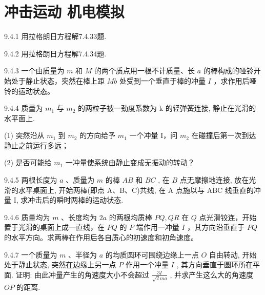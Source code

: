 \section{冲击运动 机电模拟}

\begin{problem}{9.4.1}
用拉格朗日方程解7.4.33题.
\end{problem}
\clearpage


\begin{problem}{9.4.2}
用拉格朗日方程解7.4.34题.
\end{problem}
\clearpage


\begin{problem}{9.4.3}
一个由质量为 $m$ 和 $M$ 的两个质点用一根不计质量、长 $a$ 的棒构成的哑铃开始处于静止状态，突然在棒上距 $Mb$ 处受到一个垂直于棒的冲量 $I$ ，求作用后哑铃的运动状态。
\end{problem}
\clearpage


\begin{problem}{9.4.4}
质量为 $m_{1}$ 与 $m_{2}$ 的两粒子被一劲度系数为 k 的轻弹簧连接, 静止在光滑的水平面上.

(1) 突然沿从 $m_{1}$ 到 $m_{2}$ 的方向给予 $m_{1}$ 一个冲量 I，问 $m_{2}$ 在碰撞后第一次到达静止之前运行多远；

(2) 是否可能给 $m_{1}$ 一冲量使系统由静止变成无振动的转动？
\end{problem}
\clearpage


\begin{problem}{9.4.5}
两根长度为 $a$ 、质量为 $m$ 的棒 $AB$ 和 $BC$ , 在 $B$ 点无摩擦地连接, 放在光滑的水平桌面上, 开始两棒(即点 A、B、C)共线, 在 A 点施以与 ABC 线垂直的冲量 I, 求冲击后的瞬时两棒的运动状态.
\end{problem}
\clearpage


\begin{problem}{9.4.6}
质量均为 $m$ 、长度均为 $2a$ 的两根均质棒 $PQ, QR$ 在 $Q$ 点光滑铰连，开始置于光滑的桌面上成一直线，在 $PQ$ 的 $P$ 端作用一冲量 $I$ ，其方向沿垂直于 $PQ$ 的水平方向。求两棒在作用后各自质心的初速度和初角速度。
\end{problem}
\clearpage


\begin{problem}{9.4.7}
一个质量为 $m$ 、半径为 $a$ 的均质圆环可围绕边缘上一点 $O$ 自由转动, 开始处于静止状态, 突然在边缘上另一点 $P$ 作用一个冲量 $I$ , 其方向垂直于圆环所在平面. 证明: 由此冲量产生的角速度大小不会超过 $\frac{3I}{\sqrt{2}ma}$ , 并求产生这么大的角速度 $OP$ 的距离.
\end{problem}
\clearpage


